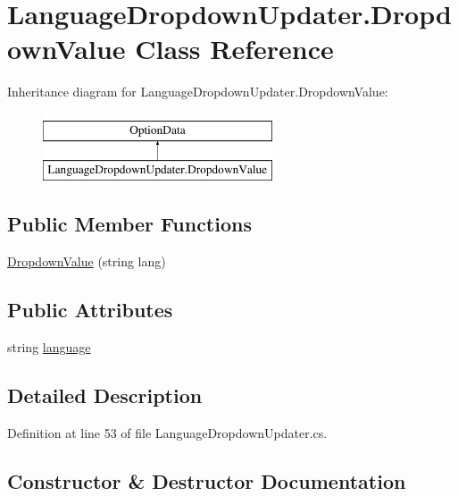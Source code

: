 \hypertarget{class_language_dropdown_updater_1_1_dropdown_value}{}\section{Language\+Dropdown\+Updater.\+Dropdown\+Value Class Reference}
\label{class_language_dropdown_updater_1_1_dropdown_value}
Inheritance diagram for Language\+Dropdown\+Updater.\+Dropdown\+Value\+:\begin{figure}[H]
\begin{center}
\leavevmode
\includegraphics[height=2.000000cm]{class_language_dropdown_updater_1_1_dropdown_value}
\end{center}
\end{figure}
\subsection*{Public Member Functions}
\begin{DoxyCompactItemize}
\item 
\hyperlink{class_language_dropdown_updater_1_1_dropdown_value_afae24a20b20e43b41758561d71161aa6}{Dropdown\+Value} (string lang)
\end{DoxyCompactItemize}
\subsection*{Public Attributes}
\begin{DoxyCompactItemize}
\item 
string \hyperlink{class_language_dropdown_updater_1_1_dropdown_value_a88e9f47be967123c364791c6990863b4}{language}
\end{DoxyCompactItemize}


\subsection{Detailed Description}


Definition at line 53 of file Language\+Dropdown\+Updater.\+cs.



\subsection{Constructor \& Destructor Documentation}
\mbox{\label{class_language_dropdown_updater_1_1_dropdown_value_afae24a20b20e43b41758561d71161aa6}} 
